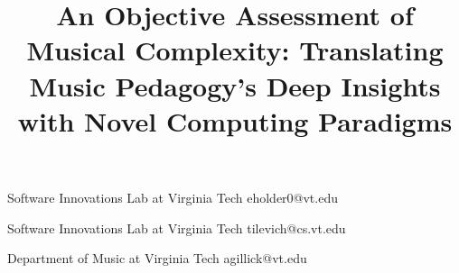\documentclass[10pt,preprint]{sigplanconf}
\begin{document}
\permissiontopublish
{} 

\title{An Objective Assessment of Musical Complexity: Translating Music Pedagogy's Deep Insights with Novel Computing Paradigms}

					 {Software Innovations Lab at Virginia Tech}
					 {eholder0@vt.edu}
					 
					 {Software Innovations Lab at Virginia Tech}
					 {tilevich@cs.vt.edu}
					 
					 {Department of Music at Virginia Tech}
					 {agillick@vt.edu}
					 

\maketitle
\end{document}
